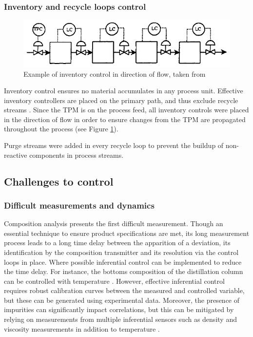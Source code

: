\subsubsection{Inventory and recycle loops control} %
    \begin{figure}
        \centering
        \includegraphics[width=\linewidth]{chapters/4-operation-control/4-Figures/TPM-Price-1994.png}
        \caption{Example of inventory control in direction of flow, taken from \textcite{price_throughput_1994}}
        \label{fig:TPM}
    \end{figure}
Inventory control ensures no material accumulates in any process unit. Effective inventory controllers are placed on the primary path, and thus exclude recycle streams \cite{price_throughput_1994}. Since the TPM is on the process feed, all inventory controls were placed in the direction of flow in order to ensure changes from the TPM are propagated throughout the process (see Figure \ref{fig:TPM}). 

Purge streams were added in every recycle loop to prevent the buildup of non-reactive components in process streams.  


\subsection{Challenges to control}%

\subsubsection{Difficult measurements and dynamics} %
Composition analysis presents the first difficult measurement. Though an essential technique to ensure product specifications are met, its long measurement process leads to a long time delay between the apparition of a deviation, its identification by the composition transmitter and its resolution via the control loops in place. Where possible inferential control can be implemented to reduce the time delay. For instance, the bottoms composition of the distillation column can be controlled with temperature \cite{kister_distillation_1990}. However, effective inferential control requires robust calibration curves between the measured and controlled variable, but these can be generated using experimental data. Moreover, the presence of impurities can significantly impact correlations, but this can be mitigated by relying on measurements from multiple inferential sensors such as density and viscosity measurements in addition to temperature \cite{aavos_international_liquid_nodate}.

